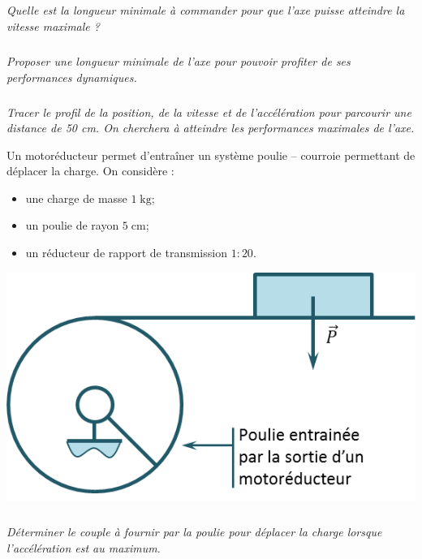 \documentclass[10pt,fleqn]{article} %
\begin{document}
\begin{multicols}{2}
\subparagraph{}
\textit{Quelle est la longueur minimale à commander pour que l'axe puisse atteindre la vitesse maximale ?}
\ifprof
\begin{corrige}
\end{corrige}
\else
\fi

\subparagraph{}
\textit{Proposer une longueur minimale de l'axe pour pouvoir profiter de ses performances dynamiques.}
\ifprof
\begin{corrige}
\end{corrige}
\else
\fi


\subparagraph{}
\textit{Tracer le profil de la position, de la vitesse et de l'accélération pour parcourir une distance de 50 cm. On cherchera à atteindre les performances maximales de l'axe. }
\ifprof
\begin{corrige}
\end{corrige}
\else
\fi


Un motoréducteur permet d'entraîner un système poulie -- courroie permettant de déplacer la charge. On considère :
\begin{itemize}
\item une charge de masse $1\; \text{kg}$;
\item un poulie de rayon $5\; \text{cm}$;
\item un réducteur de rapport de transmission $1:20$.
\end{itemize}

\begin{center}
\includegraphics[width=.9\linewidth]{images/fig_12}
\end{center}

\subparagraph{}
\textit{Déterminer le couple à fournir par la poulie pour déplacer la charge lorsque l'accélération est au maximum. }
\ifprof
\begin{corrige}
\end{corrige}
\else
\fi



\end{multicols}
\end{document}
